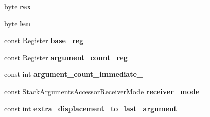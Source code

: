 \begin{DoxyCompactItemize}
\item 
byte {\bfseries rex\+\_\+}\hypertarget{classv8_1_1internal_1_1_b_a_s_e___e_m_b_e_d_d_e_d_adc6a1e13dbd64f2ff8c1f7cd57495ab6}{}\label{classv8_1_1internal_1_1_b_a_s_e___e_m_b_e_d_d_e_d_adc6a1e13dbd64f2ff8c1f7cd57495ab6}

\item 
byte {\bfseries len\+\_\+}\hypertarget{classv8_1_1internal_1_1_b_a_s_e___e_m_b_e_d_d_e_d_a65c9e7af2faf14fe427ec3ed7e2eaca0}{}\label{classv8_1_1internal_1_1_b_a_s_e___e_m_b_e_d_d_e_d_a65c9e7af2faf14fe427ec3ed7e2eaca0}

\item 
const \hyperlink{structv8_1_1internal_1_1_register}{Register} {\bfseries base\+\_\+reg\+\_\+}\hypertarget{classv8_1_1internal_1_1_b_a_s_e___e_m_b_e_d_d_e_d_a76adf789fe271b01309f836bed54343c}{}\label{classv8_1_1internal_1_1_b_a_s_e___e_m_b_e_d_d_e_d_a76adf789fe271b01309f836bed54343c}

\item 
const \hyperlink{structv8_1_1internal_1_1_register}{Register} {\bfseries argument\+\_\+count\+\_\+reg\+\_\+}\hypertarget{classv8_1_1internal_1_1_b_a_s_e___e_m_b_e_d_d_e_d_aa2d8ab55485a7700f1488bfb10e13d57}{}\label{classv8_1_1internal_1_1_b_a_s_e___e_m_b_e_d_d_e_d_aa2d8ab55485a7700f1488bfb10e13d57}

\item 
const int {\bfseries argument\+\_\+count\+\_\+immediate\+\_\+}\hypertarget{classv8_1_1internal_1_1_b_a_s_e___e_m_b_e_d_d_e_d_ad50e66d3da801a4deb697f594164199a}{}\label{classv8_1_1internal_1_1_b_a_s_e___e_m_b_e_d_d_e_d_ad50e66d3da801a4deb697f594164199a}

\item 
const Stack\+Arguments\+Accessor\+Receiver\+Mode {\bfseries receiver\+\_\+mode\+\_\+}\hypertarget{classv8_1_1internal_1_1_b_a_s_e___e_m_b_e_d_d_e_d_acc4a701491993e2adf85c5d39d84a3d5}{}\label{classv8_1_1internal_1_1_b_a_s_e___e_m_b_e_d_d_e_d_acc4a701491993e2adf85c5d39d84a3d5}

\item 
const int {\bfseries extra\+\_\+displacement\+\_\+to\+\_\+last\+\_\+argument\+\_\+}\hypertarget{classv8_1_1internal_1_1_b_a_s_e___e_m_b_e_d_d_e_d_a08d07859abe373b6f531f49081d556cb}{}\label{classv8_1_1internal_1_1_b_a_s_e___e_m_b_e_d_d_e_d_a08d07859abe373b6f531f49081d556cb}

\end{DoxyCompactItemize}
